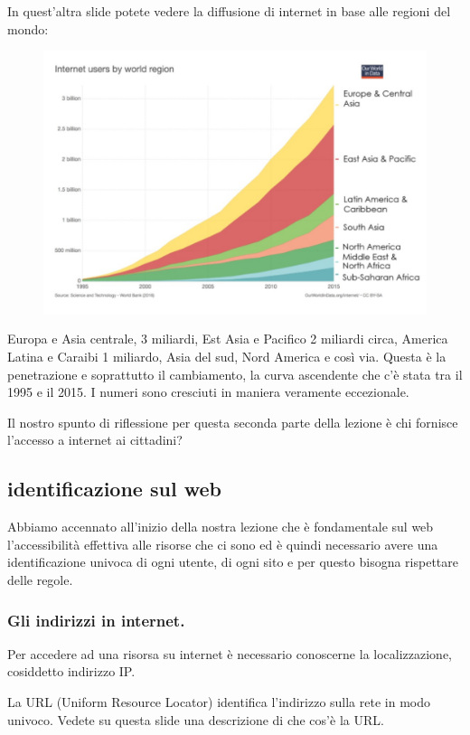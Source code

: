 In quest'altra slide potete vedere la diffusione di internet in base alle regioni del mondo:
\begin{figure}[ht]
    \centering
    \includegraphics[width=0.9\linewidth]{images/03_lez_fig_06.jpg}
\end{figure}


Europa e Asia centrale, 3 miliardi, Est Asia e Pacifico 2 miliardi circa, America Latina e Caraibi 1 miliardo, Asia del sud, Nord America e così via. Questa è la penetrazione e soprattutto il cambiamento, la curva ascendente che c'è stata tra il 1995 e il 2015. I numeri sono cresciuti in maniera veramente eccezionale. \par
Il nostro spunto di riflessione per questa seconda parte della lezione è chi fornisce l'accesso a internet ai cittadini?\par

\subsection{identificazione sul web}

Abbiamo accennato all'inizio della nostra lezione che è fondamentale sul web l'accessibilità effettiva alle risorse che ci sono ed è quindi necessario avere una identificazione univoca di ogni utente, di ogni sito e  per questo bisogna rispettare delle regole.\par

\subsubsection{Gli indirizzi in internet.}

Per accedere ad una risorsa su internet è necessario conoscerne la localizzazione, cosiddetto indirizzo IP.\par
La URL (Uniform Resource Locator) identifica l'indirizzo sulla rete in modo univoco.
Vedete su questa slide una descrizione di che cos'è la URL.

